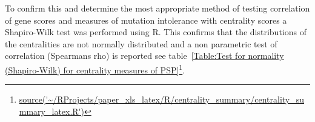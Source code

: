 To confirm this and determine the most appropriate method of testing correlation of gene scores and measures of mutation intolerance with centrality scores a Shapiro-Wilk test was performed using R. This confirms that the distributions of the centralities are not normally distributed and a non parametric test of correlation (Spearmans rho) is reported see table~\ref{Table:Test for normality (Shapiro-Wilk) for centrality measures of PSP}\footnote{\url{source('~/RProjects/paper_xls_latex/R/centrality_summary/centrality_summary_latex.R')}}.

